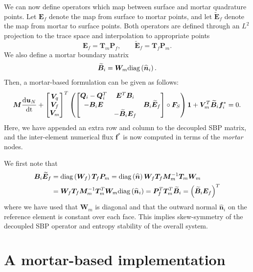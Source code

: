 \documentclass[review]{siamart0216}
\renewcommand{\tilde}{\widetilde}
\renewcommand{\hat}{\widehat}
\newcommand{\td}[2]{\frac{{\rm d}#1}{{\rm d}{\rm #2}}}
\newcommand{\LRp}[1]{\left( #1 \right)}
\newcommand{\note}[1]{{\color{blue}{#1}}}
\newcommand{\diag}[1]{{\rm diag}\LRp{#1}}
\begin{document}
We can now define operators which map between surface and mortar quadrature points.  Let $\bm{E}_f$ denote the map from surface to mortar points, and let $\tilde{\bm{E}}_f $ denote the map from mortar to surface points.  Both operators are defined through an $L^2$ projection to the trace space and interpolation to appropriate points
\[
\bm{E}_f = \bm{T}_m \bm{P}_f, \qquad \tilde{\bm{E}}_f = \bm{T}_f \bm{P}_m.
\]  
We also define a mortar boundary matrix
\[
\tilde{\bm{B}}_i = \bm{W}_m\diag{\hat{\bm{n}}_i}.
\]
Then, a mortar-based formulation can be given as follows:
\begin{equation}
\bm{M}\td{\bm{u}_N}{t} + \begin{bmatrix} \bm{V}_q \\ \bm{V}_f \\ \bm{V}_m \end{bmatrix}^T
\LRp{\begin{bmatrix}
\bm{Q}_i-\bm{Q}_i^T & \bm{E}^T\bm{B}_i &\\
-\bm{B}_i\bm{E} &  & \bm{B}_i\tilde{\bm{E}}_f \\
& -\tilde{\bm{B}}_i{\bm{E}}_f & 
\end{bmatrix} \circ \bm{F}_S}\bm{1} + \bm{V}_m^T\tilde{\bm{B}}_i\bm{f}_i^* = 0.  
\label{eq:mortar}
\end{equation}
Here, we have appended an extra row and column to the decoupled SBP matrix, and the inter-element numerical flux $\bm{f}^*$ is now computed in terms of the \emph{mortar} nodes.  

We first note that
\begin{align*}
\bm{B}_i\tilde{\bm{E}}_f &= \diag{\bm{W}_f} \bm{T}_f \bm{P}_m = \diag{\hat{\bm{n}}} \bm{W}_f \bm{T}_f \bm{M}_m^{-1}\bm{T}_m\bm{W}_m\\
&=  \bm{W}_f \bm{T}_f \bm{M}_m^{-1}\bm{T}^T_m\bm{W}_m\diag{\hat{\bm{n}}_i} = \bm{P}_f^T\bm{T}^T_m \tilde{\bm{B}}_i = \LRp{\tilde{\bm{B}}_i{\bm{E}}_f}^T
\end{align*}
where we have used that $\bm{W}_m$ is diagonal and that the outward normal $\hat{\bm{n}}_i$ on the reference element is constant over each face.  This implies skew-symmetry of the decoupled SBP operator and entropy stability of the overall system.    


\note{Finish}

\section{A mortar-based implementation}
\end{document}

